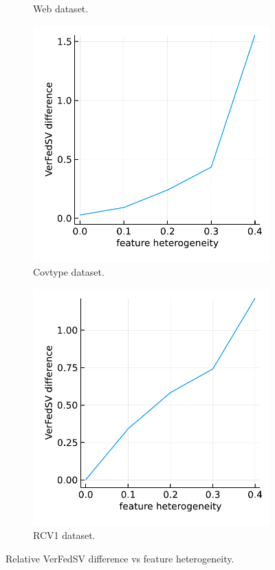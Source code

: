 \begin{figure}[t]
\begin{subfigure}{.24\textwidth}
  \caption{Web dataset.}
  \label{fig:syn_similar_feature_web}
\end{subfigure} 
\begin{subfigure}{.24\textwidth}
  \centering
  \includegraphics[width=\linewidth]{./figures/syn_similar_feature_covtype.pdf}
  \caption{Covtype dataset.}
  \label{fig:syn_similar_feature_covtype}
\end{subfigure}
\begin{subfigure}{.24\textwidth}
  \centering
  \includegraphics[width=\linewidth]{./figures/syn_similar_feature_rcv1.pdf}
  \caption{RCV1 dataset.}
  \label{fig:syn_similar_feature_rcv1}
\end{subfigure}
\caption{Relative VerFedSV difference vs feature heterogeneity.}
\label{fig:syn_similar_feature}
\end{figure}

